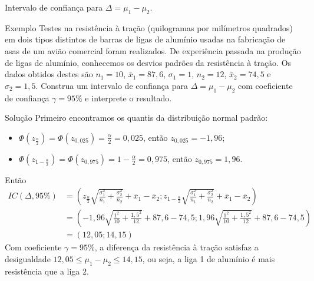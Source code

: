\documentclass[9pt]{beamer}
\begin{document}
\begin{frame}{Intervalo de confiança para $\Delta = \mu_1-\mu_2$.}

\tiny

\begin{block}{Exemplo}
	Testes na resistência à tração (quilogramas por milímetros quadrados) em dois tipos distintos de barras de ligas de alumínio usadas na fabricação de asas de um avião comercial foram realizados. De experiência passada na produção de ligas de alumínio, conhecemos os desvios padrões da resistência à tração. Os dados obtidos destes são $n_1=10$, $\bar{x}_1=87,6$, $\sigma_1=1$, $n_2=12$, $\bar{x}_2=74,5$ e $\sigma_2=1,5$. Construa um intervalo de confiança para $\Delta=\mu_1-\mu_2$ com coeficiente de confiança $\gamma=95\%$ e interprete o resultado.
\end{block}

\begin{block}{Solução}
	Primeiro encontramos os quantis da distribuição normal padrão:
	\begin{itemize}
		\item $\Phi\left(z_{\frac{\alpha}{2}}\right) = \Phi\left(z_{0,025}\right) = \frac{\alpha}{2} = 0,025$, então $z_{0,025} = -1,96$;
		\item $\Phi\left(z_{1-\frac{\alpha}{2}}\right) = \Phi\left(z_{0,975}\right) =1- \frac{\alpha}{2} = 0,975$, então $z_{0,975} = 1,96$.
	\end{itemize}
	Então
	\begin{align*}
		IC(\Delta, 95\%) &= \left( z_{\frac{\alpha}{2}} \sqrt{ \frac{\sigma_1^2}{n_1} + \frac{\sigma_2^2}{n_2}}  + \bar{x}_1 - \bar{x}_2; z_{1-\frac{\alpha}{2}} \sqrt{ \frac{\sigma_1^2}{n_1} + \frac{\sigma_2^2}{n_2}}  + \bar{x}_1 - \bar{x}_2  \right)\\
		&= \left( -1,96 \sqrt{ \frac{1^2}{10} + \frac{1,5^2}{12}} + 87,6 - 74,5; 1,96 \sqrt{ \frac{1^2}{10} + \frac{1,5^2}{12}} + 87,6 - 74,5 \right)\\
		&= \left(12,05; 14,15\right)
	\end{align*}
	Com coeficiente $\gamma=95\%$, a diferença da resistência à tração satisfaz a desigualdade $12,05 \leq \mu_1 - \mu_2 \leq 14,15$, ou seja, a liga 1 de alumínio é mais resistência que a liga 2.
\end{block}

\normalsize
\end{frame}
\end{document}
